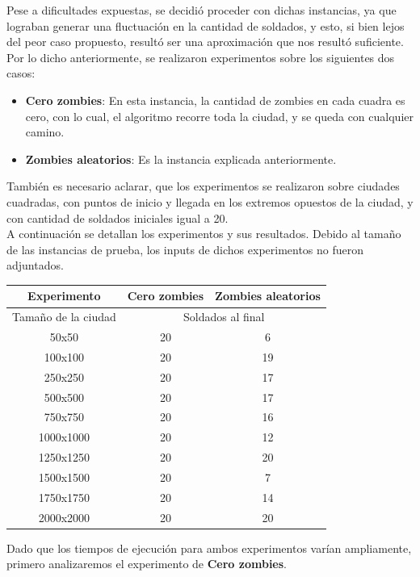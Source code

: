 Pese a dificultades expuestas, se decidió proceder con dichas instancias, ya que lograban generar una fluctuación en la cantidad de soldados, y esto, si bien lejos del peor caso propuesto, resultó ser una aproximación que nos resultó suficiente.\\

Por lo dicho anteriormente, se realizaron experimentos sobre los siguientes dos casos:
\begin{itemize}
	\item \textbf{Cero zombies}: En esta instancia, la cantidad de zombies en cada cuadra es cero, con lo cual, el algoritmo recorre toda la ciudad, y se queda con cualquier camino.
	\item \textbf{Zombies aleatorios}: Es la instancia explicada anteriormente.
\end{itemize}

También es necesario aclarar, que los experimentos se realizaron sobre ciudades cuadradas, con puntos de inicio y llegada en los extremos opuestos de la ciudad, y con cantidad de soldados iniciales igual a 20.\\

A continuación se detallan los experimentos y sus resultados.
Debido al tamaño de las instancias de prueba, los inputs de dichos experimentos no fueron adjuntados.
\begin{center}
	\begin{tabular}{|c|c|c|}
	\hline
	Experimento & \textbf{Cero zombies} & \textbf{Zombies aleatorios}\\
	\hline
	\hline
	Tamaño de la ciudad & \multicolumn{2}{|c|}{Soldados al final}\\
	\hline
	50x50 & 20 & 6\\
	\hline
	100x100 & 20 & 19\\
	\hline
	250x250 & 20 & 17\\
	\hline
	500x500 & 20 & 17\\
	\hline
	750x750 & 20 & 16\\
	\hline
	1000x1000 & 20 & 12\\
	\hline
	1250x1250 & 20 & 20\\
	\hline
	1500x1500 & 20 & 7\\
	\hline
	1750x1750 & 20 & 14\\
	\hline
	2000x2000 & 20 & 20\\
	\hline
	\end{tabular}
\end{center}

Dado que los tiempos de ejecución para ambos experimentos varían ampliamente, primero analizaremos el experimento de \textbf{Cero zombies}.

